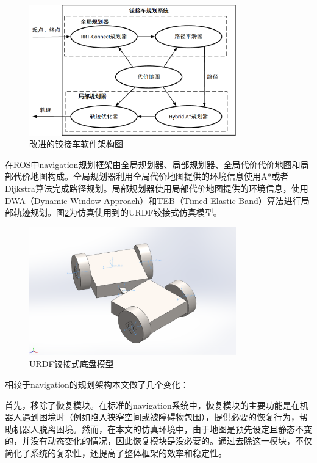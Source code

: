 \documentclass[master,academic]{ysuthesis} %
\begin{document}
	\begin{figure}[H]
		\centering
		\includegraphics[width=0.8\textwidth]{我的规划框架.png}
		\caption{改进的铰接车软件架构图}
		\label{fig:改进的规划框架图}
	\end{figure}
	
	在ROS中navigation规划框架由全局规划器、局部规划器、全局代价代价地图和局部代价地图构成。全局规划器利用全局代价地图提供的环境信息使用A*或者Dijkstra算法完成路径规划。局部规划器使用局部代价地图提供的环境信息，使用DWA（Dynamic Window Approach）和TEB（Timed Elastic Band）算法进行局部轨迹规划。图\ref{fig:URDF铰接式底盘模型}为仿真使用到的URDF铰接式仿真模型。
	\begin{figure}[H]
		\centering
		\includegraphics[width=0.8\textwidth]{urdf.png}
		\caption{URDF铰接式底盘模型}
		\label{fig:URDF铰接式底盘模型}
	\end{figure}
	
	相较于navigation的规划架构本文做了几个变化：

	首先，移除了恢复模块。在标准的navigation系统中，恢复模块的主要功能是在机器人遇到困境时（例如陷入狭窄空间或被障碍物包围），提供必要的恢复行为，帮助机器人脱离困境。然而，在本文的仿真环境中，由于地图是预先设定且静态不变的，并没有动态变化的情况，因此恢复模块是没必要的。通过去除这一模块，不仅简化了系统的复杂性，还提高了整体框架的效率和稳定性。
\end{document}
